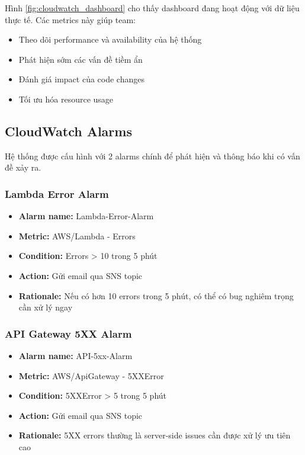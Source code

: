 Hình \ref{fig:cloudwatch_dashboard} cho thấy dashboard đang hoạt động với dữ liệu thực tế. Các metrics này giúp team:
\begin{itemize}
    \item Theo dõi performance và availability của hệ thống
    \item Phát hiện sớm các vấn đề tiềm ẩn
    \item Đánh giá impact của code changes
    \item Tối ưu hóa resource usage
\end{itemize}

\subsection{CloudWatch Alarms}
\label{ssec:cloudwatch_alarms}

Hệ thống được cấu hình với 2 alarms chính để phát hiện và thông báo khi có vấn đề xảy ra.

\subsubsection{Lambda Error Alarm}

\begin{itemize}
    \item \textbf{Alarm name:} Lambda-Error-Alarm
    \item \textbf{Metric:} AWS/Lambda - Errors
    \item \textbf{Condition:} Errors > 10 trong 5 phút
    \item \textbf{Action:} Gửi email qua SNS topic
    \item \textbf{Rationale:} Nếu có hơn 10 errors trong 5 phút, có thể có bug nghiêm trọng cần xử lý ngay
\end{itemize}

\subsubsection{API Gateway 5XX Alarm}

\begin{itemize}
    \item \textbf{Alarm name:} API-5xx-Alarm
    \item \textbf{Metric:} AWS/ApiGateway - 5XXError
    \item \textbf{Condition:} 5XXError > 5 trong 5 phút
    \item \textbf{Action:} Gửi email qua SNS topic
    \item \textbf{Rationale:} 5XX errors thường là server-side issues cần được xử lý ưu tiên cao
\end{itemize}

